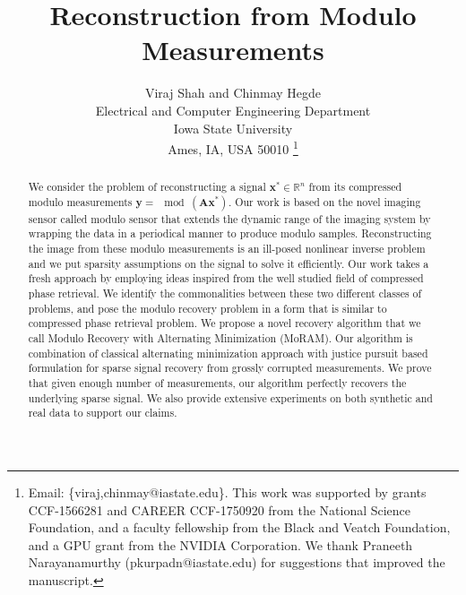 \documentclass[10pt,journal]{IEEEtran}
\def\R{{\mathbb{R}}}
\newcommand{\mb}[1]{\mathbf{#1}}
\begin{document}
\title{Reconstruction from Modulo Measurements}

\author{
	Viraj Shah and Chinmay Hegde \\
	Electrical and Computer Engineering Department \\
	Iowa State University \\
	Ames, IA, USA 50010
	\thanks{Email: \{viraj,chinmay@iastate.edu\}. This work was supported by grants CCF-1566281 and CAREER CCF-1750920 from the National Science Foundation, and a faculty fellowship from the Black and Veatch Foundation, and a GPU grant from the NVIDIA Corporation.	
	We thank Praneeth Narayanamurthy (pkurpadn@iastate.edu) for suggestions that improved the manuscript.
}
}


\maketitle

\begin{abstract}
	We consider the problem of reconstructing a signal $\mb{x^*} \in \R^n$ from its compressed modulo measurements $\mb{y}=\mod(\mb{Ax^*})$. Our work is based on the novel imaging sensor called modulo sensor that extends the dynamic range of the imaging system by wrapping the data in a periodical manner to produce modulo samples. Reconstructing the image from these modulo measurements is an ill-posed nonlinear inverse problem and we put sparsity assumptions on the signal to solve it efficiently. Our work takes a fresh approach by employing ideas inspired from the well studied field of compressed phase retrieval. We identify the commonalities between these two different classes of problems, and pose the modulo recovery problem in a form that is similar to compressed phase retrieval problem. We propose a novel recovery algorithm that we call Modulo Recovery with Alternating Minimization (MoRAM). Our algorithm is combination of classical alternating minimization approach with justice pursuit based formulation for sparse signal recovery from grossly corrupted measurements. We prove that given enough number of measurements, our algorithm perfectly recovers the underlying sparse signal. We also provide extensive experiments on both synthetic and real data to support our claims. 
\end{abstract}







%
%
%


%
%
\end{document}
